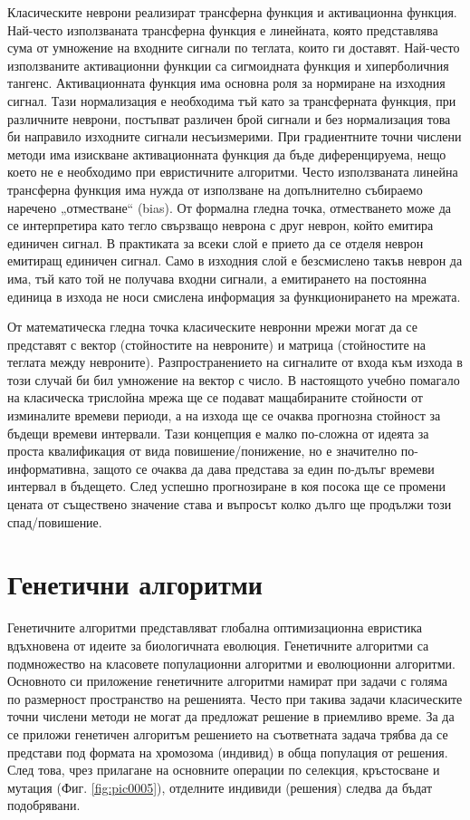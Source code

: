 \documentclass[book,14pt,oneside,openany]{memoir}
\begin{document}
Класическите неврони реализират трансферна функция и активационна функция. Най-често използваната трансферна функция е линейната, която представлява сума от умножение на входните сигнали по теглата, които ги доставят. Най-често използваните активационни функции са сигмоидната функция и хиперболичния тангенс. Активационната функция има основна роля за нормиране на изходния сигнал. Тази нормализация е необходима тъй като за трансферната функция, при различните неврони, постъпват различен брой сигнали и без нормализация това би направило изходните сигнали несъизмерими. При градиентните точни числени методи има изискване активационната функция да бъде диференцируема, нещо което не е необходимо при евристичните алгоритми. Често използваната линейна трансферна функция има нужда от използване на допълнително събираемо наречено „отместване“ (bias). От формална гледна точка, отместването може да се интерпретира като тегло свързващо неврона с друг неврон, който емитира единичен сигнал. В практиката за всеки слой е прието да се отделя неврон емитиращ единичен сигнал. Само в изходния слой е безсмислено такъв неврон да има, тъй като той не получава входни сигнали, а емитирането на постоянна единица в изхода не носи смислена информация за функционирането на мрежата. 

От математическа гледна точка класическите невронни мрежи могат да се представят с вектор (стойностите на невроните) и матрица (стойностите на теглата между невроните). Разпространението на сигналите от входа към изхода в този случай би бил умножение на вектор с число. В настоящото учебно помагало на класическа трислойна мрежа ще се подават мащабираните стойности от изминалите времеви периоди, а на изхода ще се очаква прогнозна стойност за бъдещи времеви интервали. Тази концепция е малко по-сложна от идеята за проста квалификация от вида повишение/понижение, но е значително по-информативна, защото се очаква да дава представа за един по-дълъг времеви интервал в бъдещето. След успешно прогнозиране в коя посока ще се промени цената от съществено значение става и въпросът колко дълго ще продължи този спад/повишение. 

\section{Генетични алгоритми}

Генетичните алгоритми представляват глобална оптимизационна евристика вдъхновена от идеите за биологичната еволюция. Генетичните алгоритми са подмножество на класовете популационни алгоритми и еволюционни алгоритми. Основното си приложение генетичните алгоритми намират при задачи с голяма по размерност пространство на решенията. Често при такива задачи класическите точни числени методи не могат да предложат решение в приемливо време. За да се приложи генетичен алгоритъм решението на съответната задача трябва да се представи под формата на хромозома (индивид) в обща популация от решения. След това, чрез прилагане на основните операции по селекция, кръстосване и мутация (Фиг. \ref{fig:pic0005}), отделните индивиди (решения) следва да бъдат подобрявани.
\end{document}
